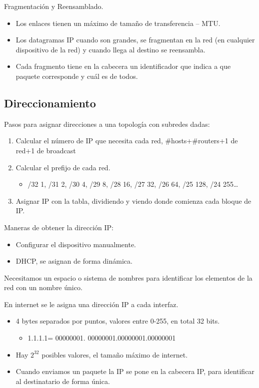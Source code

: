 \documentclass[12pt, twoside, openright]{report} %
\begin{document}
Fragmentación y Reensamblado.

\begin{itemize}
	\item Los enlaces tienen un máximo de tamaño de transferencia -- MTU.
	\item Los datagramas IP cuando son grandes, se fragmentan en la red (en
	      cualquier dispositivo de la red) y cuando llega al destino se
	      reensambla.
	\item Cada fragmento tiene en la cabecera un identificador que indica a
	      que paquete corresponde y cuál es de todos.
\end{itemize}

\subsection{Direccionamiento}

Pasos para asignar direcciones a una topología con subredes dadas:

\begin{enumerate}
	\def\labelenumi{\arabic{enumi}.}
	\item Calcular el número de IP que necesita cada red,
	      \#hosts+\#routers+1 de red+1 de broadcast
	\item Calcular el prefijo de cada red.

	      \begin{itemize}
		      \item /32 1, /31 2, /30 4, /29 8, /28 16, /27 32, /26 64, /25 128, /24
		            255\ldots{}
	      \end{itemize}
	\item Asignar IP con la tabla, dividiendo y viendo donde comienza cada
	      bloque de IP.
\end{enumerate}

Maneras de obtener la dirección IP:

\begin{itemize}
	\item Configurar el dispositivo manualmente.
	\item DHCP, se asignan de forma dinámica.
\end{itemize}

Necesitamos un espacio o sistema de nombres para identificar los
elementos de la red con un nombre único.

En internet se le asigna una dirección IP a cada interfaz.

\begin{itemize}
	\item 4 bytes separados por puntos, valores entre 0-255, en total 32
	      bits.

	      \begin{itemize}
		      \item 1.1.1.1= 00000001. 00000001.00000001.00000001
	      \end{itemize}
	\item Hay \(2^{32}\) posibles valores, el tamaño máximo de internet.
	\item Cuando enviamos un paquete la IP se pone en la cabecera IP, para
	      identificar al destinatario de forma única.
\end{itemize}
\end{document}
